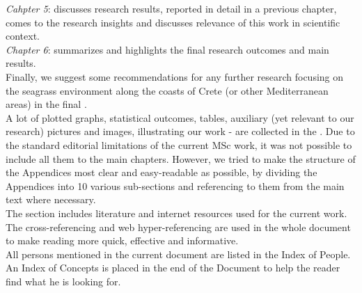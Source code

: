 \documentclass[11pt]{article}
\begin{document}
\textit{Cahpter 5}:  discusses research results, reported in detail in a previous chapter, comes to the research insights and discusses relevance of this work in scientific context.\\
\textit{Chapter 6}:  summarizes and highlights the final research outcomes and main results.\\
Finally, we suggest some recommendations for any further research focusing on the seagrass environment along the coasts of Crete (or other Mediterranean areas) in the final .\\
A lot of plotted graphs, statistical outcomes, tables, auxiliary (yet relevant to our research) pictures and images, illustrating our work - are collected in the . Due to the standard editorial limitations of the current MSc work, it was not possible to include all them to the main chapters. However, we tried to make the structure of the Appendices most clear and easy-readable as possible, by dividing the Appendices into 10 various sub-sections and referencing to them from the main text where necessary. \\
The  section includes literature and internet resources used for the current work. The cross-referencing and web hyper-referencing are used in the whole document to make reading more quick, effective and informative.\\
All persons mentioned in the current document are listed in the Index of People. \\
An Index of Concepts is placed in the end of the Document to help the reader find what he is looking for.

\pagebreak
\end{document}

